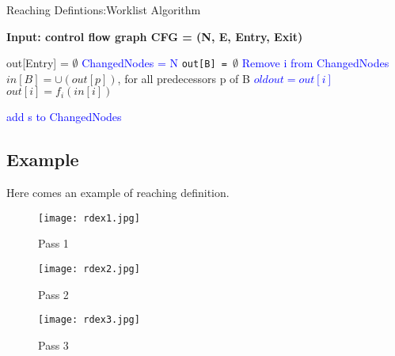 \begin{algorithm}
    \caption{Reaching Defintions:Worklist Algorithm}\label{alg:reachingdefiterative}
    \hspace*{\algorithmicindent} \textbf{Input: control flow graph CFG = (N, E, Entry, Exit) } \\
   
    
    \begin{algorithmic}
   
    \State out[Entry] = $\emptyset$ 
    \State \textcolor{blue}{ChangedNodes = N}   
        \State \texttt{out[B] = $\emptyset$} 
    \EndFor
        \State \textcolor{blue}{Remove i from ChangedNodes}
        \State $in[B] =  \cup (out[p])$, for all predecessors p of B
        \State \textcolor{blue}{$oldout = out[i]$}
        \State $out[i] = f_i(in[i])$ 

                \State \textcolor{blue}{add s to ChangedNodes}
            \EndFor
        \EndIf

    \EndWhile
    \end{algorithmic}
\end{algorithm}



\subsection{Example}
Here comes an example of reaching definition.

\begin{figure}[!htb]
      \texttt{[image: rdex1.jpg]}
      \caption{Pass 1}\label{fig:awesome_image1}
    \endminipage\hfill
      \texttt{[image: rdex2.jpg]}
      \caption{Pass 2}\label{fig:awesome_image2}
    \endminipage\hfill
      \texttt{[image: rdex3.jpg]}
      \caption{Pass 3}\label{fig:awesome_image3}
    \endminipage
\end{figure}